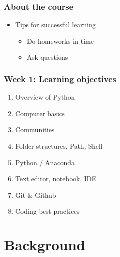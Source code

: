 \documentclass{beamer}
\begin{document}
\begin{frame}
    \frametitle{About the course} %
    \begin{itemize}
        \item Tips for successful learning
            \begin{itemize}
                \item Do homeworks in time
                \item Ask questions
            \end{itemize}
    \end{itemize}        
    \end{frame}


\begin{frame}
    \frametitle{Week 1: Learning objectives}
    \begin{enumerate}
        \item Overview of Python 
        \item Computer basics
        \item Communities
        \item Folder structures, Path, Shell
        \item Python / Anaconda
        \item Text editor, notebook, IDE
        \item Git & Github
        \item Coding best practices
    \end{enumerate}
\end{frame}

\section{Background} 
\end{document}

